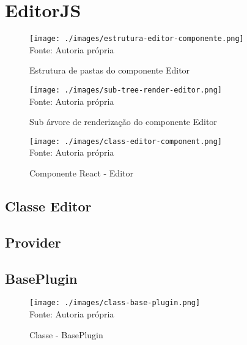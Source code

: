 \section{EditorJS}

\begin{figure}[H]
    \centering
    \caption{Estrutura de pastas do componente Editor}
    \texttt{[image: ./images/estrutura-editor-componente.png]}
    \label{fig:estrutura-editor-componente} \\
    \textnormal{\fontsize{10pt}{12pt}Fonte: Autoria própria}
\end{figure}

\begin{figure}[H]
    \centering
    \caption{Sub árvore de renderização do componente Editor}
    \texttt{[image: ./images/sub-tree-render-editor.png]}
    \label{fig:sub-tree-render-editor} \\
    \textnormal{\fontsize{10pt}{12pt}Fonte: Autoria própria}
\end{figure}

\begin{figure}[H]
    \centering
    \caption{Componente React - Editor}
    \texttt{[image: ./images/class-editor-component.png]}
    \label{fig:class-editor-component} \\
    \textnormal{\fontsize{10pt}{12pt}Fonte: Autoria própria}
\end{figure}

\subsection{Classe Editor}

\subsection{Provider}

\subsection{BasePlugin}

\begin{figure}[H]
    \centering
    \caption{Classe - BasePlugin}
    \texttt{[image: ./images/class-base-plugin.png]}
    \label{fig:class-base-plugin} \\
    \textnormal{\fontsize{10pt}{12pt}Fonte: Autoria própria}
\end{figure}

